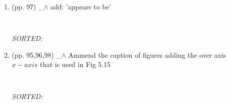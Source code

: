 \documentclass[12pt]{article}
\begin{document}
\begin{enumerate}
\item  (pp. 97)  \_$\wedge$  
	add: 'appears to be'
	\begin{verbatim}
	
	\end{verbatim}
	\textit{
	SORTED:  
	}
	\\



\item  (pp. 95,96,98)  \_$\wedge$  
	Ammend the caption of figures 
	adding the over axis $x-axis$	
	that is used in Fig 5.15
	\begin{verbatim}
	
	\end{verbatim}
	\textit{
	SORTED:  
	}
	\\


\end{enumerate}
\end{document}
